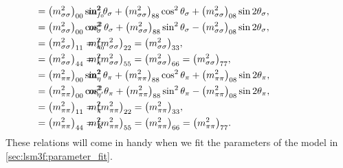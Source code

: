 \begin{subequations}
\begin{align}
	& m^2_{f_0}   && \hspace{-2.9cm} = \big(m^2_{\sigma\sigma}\big)_{00} \sin^2 \theta_\sigma + \big(m^2_{\sigma\sigma}\big)_{88} \cos^2 \theta_\sigma + \big(m^2_{\sigma\sigma}\big)_{08} \sin 2 \theta_\sigma, \\ %
	& m^2_\sigma  && \hspace{-2.9cm} = \big(m^2_{\sigma\sigma}\big)_{00} \cos^2 \theta_\sigma + \big(m^2_{\sigma\sigma}\big)_{88} \sin^2 \theta_\sigma - \big(m^2_{\sigma\sigma}\big)_{08} \sin 2 \theta_\sigma, \\ %
	& m^2_{a_0}   && \hspace{-2.9cm} = \big(m^2_{\sigma\sigma}\big)_{11} = \big(m^2_{\sigma\sigma}\big)_{22} = \big(m^2_{\sigma\sigma}\big)_{33}, \\
	& m^2_\kappa  && \hspace{-2.9cm} = \big(m^2_{\sigma\sigma}\big)_{44} = \big(m^2_{\sigma\sigma}\big)_{55} = \big(m^2_{\sigma\sigma}\big)_{66} = \big(m^2_{\sigma\sigma}\big)_{77}, \\
	& m^2_{\eta}  && \hspace{-2.9cm} = \big(m^2_{\pi\pi}\big)_{00} \sin^2 \theta_\pi + \big(m^2_{\pi\pi}\big)_{88} \cos^2 \theta_\pi + \big(m^2_{\pi\pi}\big)_{08} \sin 2 \theta_\pi, \\ %
	& m^2_{\eta'} && \hspace{-2.9cm} = \big(m^2_{\pi\pi}\big)_{00} \cos^2 \theta_\pi + \big(m^2_{\pi\pi}\big)_{88} \sin^2 \theta_\pi - \big(m^2_{\pi\pi}\big)_{08} \sin 2 \theta_\pi, \\ %
	& m^2_\pi     && \hspace{-2.9cm} = \big(m^2_{\pi\pi}\big)_{11} = \big(m^2_{\pi\pi}\big)_{22} = \big(m^2_{\pi\pi}\big)_{33}, \\
	& m^2_K       && \hspace{-2.9cm} = \big(m^2_{\pi\pi}\big)_{44} = \big(m^2_{\pi\pi}\big)_{55} = \big(m^2_{\pi\pi}\big)_{66} = \big(m^2_{\pi\pi}\big)_{77}.
\end{align}%
\label{eq:lsm:mass_system_3f}%
\end{subequations}%
These relations will come in handy when we fit the parameters of the model in \cref{sec:lsm3f:parameter_fit}.


